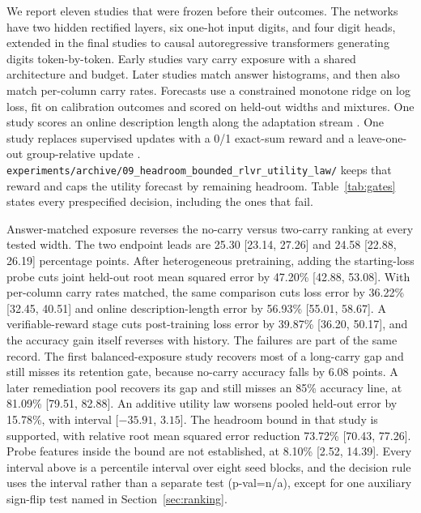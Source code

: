 We report eleven studies that were frozen before their outcomes.
The networks have two hidden rectified layers, six one-hot input digits, and four digit heads, extended in the final studies to causal autoregressive transformers generating digits token-by-token.
Early studies vary carry exposure with a shared architecture and budget.
Later studies match answer histograms, and then also match per-column carry rates.
Forecasts use a constrained monotone ridge on log loss, fit on calibration outcomes and scored on held-out widths and mixtures.
One study scores an online description length along the adaptation stream \citep{rissanen1978modeling,voita2020information}.
One study replaces supervised updates with a 0/1 exact-sum reward and a leave-one-out group-relative update \citep{shao2024deepseekmath}.
\texttt{experiments/archive/09\_headroom\_bounded\_rlvr\_utility\_law/} keeps that reward and caps the utility forecast by remaining headroom.
Table~\ref{tab:gates} states every prespecified decision, including the ones that fail.

Answer-matched exposure reverses the no-carry versus two-carry ranking at every tested width.
The two endpoint leads are 25.30 [23.14, 27.26] and 24.58 [22.88, 26.19] percentage points.
After heterogeneous pretraining, adding the starting-loss probe cuts joint held-out root mean squared error by 47.20\% [42.88, 53.08].
With per-column carry rates matched, the same comparison cuts loss error by 36.22\% [32.45, 40.51] and online description-length error by 56.93\% [55.01, 58.67].
A verifiable-reward stage cuts post-training loss error by 39.87\% [36.20, 50.17], and the accuracy gain itself reverses with history.
The failures are part of the same record.
The first balanced-exposure study recovers most of a long-carry gap and still misses its retention gate, because no-carry accuracy falls by 6.08 points.
A later remediation pool recovers its gap and still misses an 85\% accuracy line, at 81.09\% [79.51, 82.88].
An additive utility law worsens pooled held-out error by 15.78\%, with interval [$-35.91$, $3.15$].
The headroom bound in that study is supported, with relative root mean squared error reduction 73.72\% [70.43, 77.26].
Probe features inside the bound are not established, at 8.10\% [2.52, 14.39].
Every interval above is a percentile interval over eight seed blocks, and the decision rule uses the interval rather than a separate test (p-val=n/a), except for one auxiliary sign-flip test named in Section~\ref{sec:ranking}.

